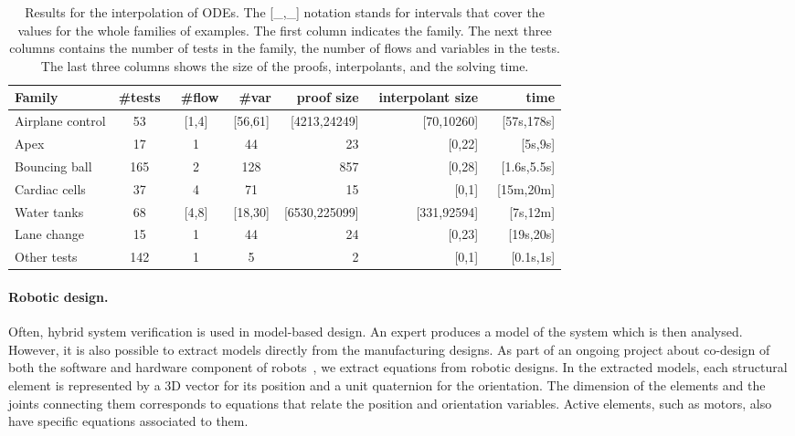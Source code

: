\begin{table}
\centering
\begin{tabular}{l|cccrrr}
Family            & \#tests    & ~\#flow &  ~\#var  & proof size      & ~interpolant size & time \\
\hline
Airplane control  &       53   &  [1,4] & [56,61] & [4213,24249]    &  [70,10260]     &   [57s,178s]  \\
Apex              &       17   &   1    &  44     &          23     &  [0,22]         &    [5s,9s]    \\
Bouncing ball     &      165   &   2    &  128    &         857     &  [0,28]         &  [1.6s,5.5s]  \\
Cardiac cells     &       37   &   4    &  71     &          15     &  [0,1]          & ~[15m,20m]    \\
Water tanks       &       68   &  [4,8] & [18,30] & [6530,225099]   &  [331,92594]    &  [7s,12m]     \\
Lane change       &       15   &   1    &  44     &          24     &  [0,23]         &   [19s,20s]   \\
Other tests       &      142   &   1    &  5      &           2     &  [0,1]          &  [0.1s,1s]   
\end{tabular}

\vspace{1ex}

\caption{
    Results for the interpolation of ODEs.
    The [\_,\_] notation stands for intervals that cover the values for the whole families of examples.
    The first column indicates the family.
    The next three columns contains the number of tests in the family, the number of flows and variables in the tests.
    The last three columns shows the size of the proofs, interpolants, and the solving time.
}
\label{tbl:ode}
\end{table}

\paragraph{Robotic design.}
Often, hybrid system verification is used in model-based design.
An expert produces a model of the system which is then analysed.
However, it is also possible to extract models directly from the manufacturing designs.
As part of an ongoing project about co-design of both the software and hardware component of robots~\cite{react}, we extract equations from robotic designs.
In the extracted models, each structural element is represented by a 3D vector for its position and a unit quaternion for the orientation.
The dimension of the elements and the joints connecting them corresponds to equations that relate the position and orientation variables.
Active elements, such as motors, also have specific equations associated to them.

